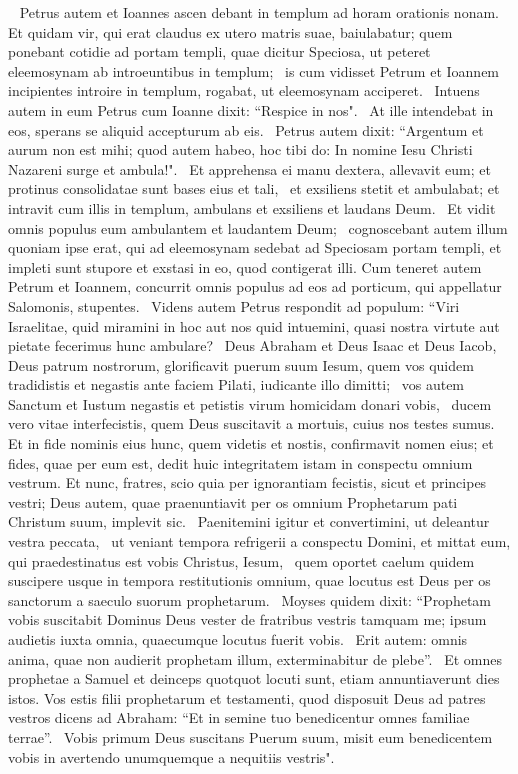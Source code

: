 \begin{biblechapter}   
\verse Petrus autem et Ioannes ascen debant in templum ad horam orationis nonam.  
\verse Et quidam vir, qui erat claudus ex utero matris suae, baiulabatur; quem ponebant cotidie ad portam templi, quae dicitur Speciosa, ut peteret eleemosynam ab introeuntibus in templum;  
\verse is cum vidisset Petrum et Ioannem incipientes introire in templum, rogabat, ut eleemosynam acciperet.  
\verse Intuens autem in eum Petrus cum Ioanne dixit: “Respice in nos".  
\verse At ille intendebat in eos, sperans se aliquid accepturum ab eis.  
\verse Petrus autem dixit: “Argentum et aurum non est mihi; quod autem habeo, hoc tibi do: In nomine Iesu Christi Nazareni surge et ambula!".  
\verse Et apprehensa ei manu dextera, allevavit eum; et protinus consolidatae sunt bases eius et tali,  
\verse et exsiliens stetit et ambulabat; et intravit cum illis in templum, ambulans et exsiliens et laudans Deum.  
\verse Et vidit omnis populus eum ambulantem et laudantem Deum;  
\verse cognoscebant autem illum quoniam ipse erat, qui ad eleemosynam sedebat ad Speciosam portam templi, et impleti sunt stupore et exstasi in eo, quod contigerat illi. 
\verse Cum teneret autem Petrum et Ioannem, concurrit omnis populus ad eos ad porticum, qui appellatur Salomonis, stupentes.  
\verse Videns autem Petrus respondit ad populum: “Viri Israelitae, quid miramini in hoc aut nos quid intuemini, quasi nostra virtute aut pietate fecerimus hunc ambulare?  
\verse Deus Abraham et Deus Isaac et Deus Iacob, Deus patrum nostrorum, glorificavit puerum suum Iesum, quem vos quidem tradidistis et negastis ante faciem Pilati, iudicante illo dimitti;  
\verse vos autem Sanctum et Iustum negastis et petistis virum homicidam donari vobis,  
\verse ducem vero vitae interfecistis, quem Deus suscitavit a mortuis, cuius nos testes sumus.  
\verse Et in fide nominis eius hunc, quem videtis et nostis, confirmavit nomen eius; et fides, quae per eum est, dedit huic integritatem istam in conspectu omnium vestrum. 
\verse Et nunc, fratres, scio quia per ignorantiam fecistis, sicut et principes vestri; 
\verse Deus autem, quae praenuntiavit per os omnium Prophetarum pati Christum suum, implevit sic. 
\verse Paenitemini igitur et convertimini, ut deleantur vestra peccata,  
\verse ut veniant tempora refrigerii a conspectu Domini, et mittat eum, qui praedestinatus est vobis Christus, Iesum,  
\verse quem oportet caelum quidem suscipere usque in tempora restitutionis omnium, quae locutus est Deus per os sanctorum a saeculo suorum prophetarum.  
\verse Moyses quidem dixit: “Prophetam vobis suscitabit Dominus Deus vester de fratribus vestris tamquam me; ipsum audietis iuxta omnia, quaecumque locutus fuerit vobis.  
\verse Erit autem: omnis anima, quae non audierit prophetam illum, exterminabitur de plebe”.  
\verse Et omnes prophetae a Samuel et deinceps quotquot locuti sunt, etiam annuntiaverunt dies istos.
\verse Vos estis filii prophetarum et testamenti, quod disposuit Deus ad patres vestros dicens ad Abraham: “Et in semine tuo benedicentur omnes familiae terrae”.  
\verse Vobis primum Deus suscitans Puerum suum, misit eum benedicentem vobis in avertendo unumquemque a nequitiis vestris". 
\end{biblechapter}

